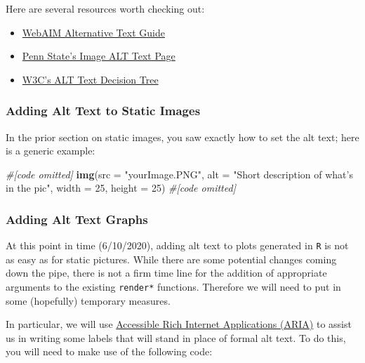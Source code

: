 \documentclass[
]{book}
\newenvironment{Shaded}{\begin{snugshade}}{\end{snugshade}}
\newcommand{\CommentTok}[1]{\textcolor[rgb]{0.56,0.35,0.01}{\textit{#1}}}
\newcommand{\DataTypeTok}[1]{\textcolor[rgb]{0.13,0.29,0.53}{#1}}
\newcommand{\DecValTok}[1]{\textcolor[rgb]{0.00,0.00,0.81}{#1}}
\newcommand{\KeywordTok}[1]{\textcolor[rgb]{0.13,0.29,0.53}{\textbf{#1}}}
\newcommand{\NormalTok}[1]{#1}
\newcommand{\StringTok}[1]{\textcolor[rgb]{0.31,0.60,0.02}{#1}}
\providecommand{\tightlist}{%
  \setlength{\itemsep}{0pt}\setlength{\parskip}{0pt}}
\begin{document}
Here are several resources worth checking out:

\begin{itemize}
\tightlist
\item
  \href{https://webaim.org/techniques/alttext/\#basics}{WebAIM Alternative Text Guide}
\item
  \href{https://accessibility.psu.edu/images/alttext/}{Penn State's Image ALT Text Page}
\item
  \href{https://www.w3.org/WAI/tutorials/images/decision-tree/}{W3C's ALT Text Decision Tree}
\end{itemize}

\hypertarget{altStatic}{%
\subsubsection{Adding Alt Text to Static Images}\label{altStatic}}

In the prior section on static images, you saw exactly how to set the alt text; here is a generic example:

\begin{Shaded}
\begin{Highlighting}[]
\CommentTok{#[code omitted]}
\KeywordTok{img}\NormalTok{(}\DataTypeTok{src =} \StringTok{"yourImage.PNG"}\NormalTok{,}
    \DataTypeTok{alt =} \StringTok{"Short description of what's in the pic"}\NormalTok{,}
    \DataTypeTok{width =} \DecValTok{25}\NormalTok{, }\DataTypeTok{height =} \DecValTok{25}\NormalTok{)}
\CommentTok{#[code omitted]}
\end{Highlighting}
\end{Shaded}

\hypertarget{adding-alt-text-graphs}{%
\subsubsection{Adding Alt Text Graphs}\label{adding-alt-text-graphs}}

At this point in time (6/10/2020), adding alt text to plots generated in \texttt{R} is not as easy as for static pictures. While there are some potential changes coming down the pipe, there is not a firm time line for the addition of appropriate arguments to the existing \texttt{render*} functions. Therefore we will need to put in some (hopefully) temporary measures.

In particular, we will use \href{https://developer.mozilla.org/en-US/docs/Web/Accessibility/ARIA}{Accessible Rich Internet Applications (ARIA)} to assist us in writing some labels that will stand in place of formal alt text. To do this, you will need to make use of the following code:
\end{document}
